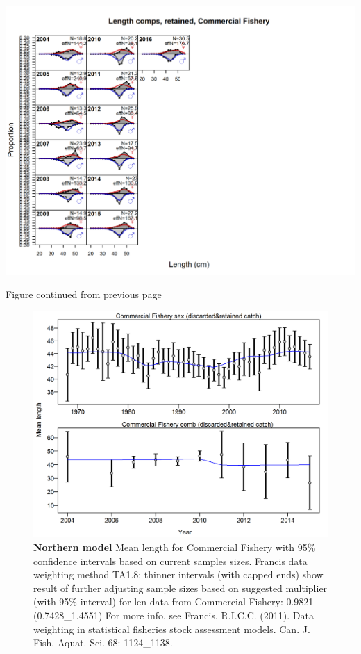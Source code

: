 \documentclass[12pt,]{article}
\begin{document}
\includegraphics{./r4ss/plots_mod1/comp_lenfit_flt1mkt2_page2.png}

\begin{center} 

            Figure continued from previous page 

            \end{center}

\begin{figure}[htbp]
\centering
\includegraphics{./r4ss/plots_mod1/comp_lenfit_data_weighting_TA1.8_Commercial Fishery.png}
\caption{\textbf{Northern model} Mean length for Commercial Fishery with
95\% confidence intervals based on current samples sizes. Francis data
weighting method TA1.8: thinner intervals (with capped ends) show result
of further adjusting sample sizes based on suggested multiplier (with
95\% interval) for len data from Commercial Fishery: 0.9821
(0.7428\_1.4551) For more info, see Francis, R.I.C.C. (2011). Data
weighting in statistical fisheries stock assessment models. Can. J.
Fish. Aquat. Sci. 68: 1124\_1138.
\label{fig:mod1_5_comp_lenfit_data_weighting_TA1.8_Commercial Fishery}}
\end{figure}
\end{document}
